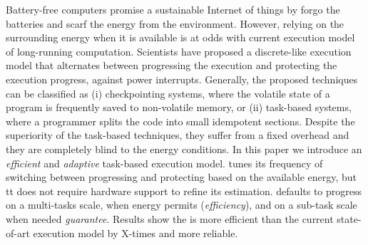 Battery-free computers promise a sustainable Internet of things by forgo the batteries and scarf the energy from the environment. 
However, relying on the surrounding energy when it is available is at odds with current execution model of long-running computation. 
Scientists have proposed a discrete-like execution model that alternates between progressing the execution and protecting the execution progress, against power interrupts.
Generally, the proposed techniques can be classified as (i) checkpointing systems, where the volatile state of a program is frequently saved to non-volatile memory, or (ii) task-based systems, where a programmer splits the code into small idempotent sections. Despite the superiority of the task-based techniques, they suffer from a fixed overhead and they are completely blind to the energy conditions.   
In this paper we introduce \sys an \emph{efficient} and \emph{adaptive} task-based execution model.
\sys tunes its frequency of switching between progressing and protecting based on the available energy, but 
tt does not require hardware support to refine its estimation. 
\sys defaults to progress on a multi-tasks scale, when energy permits (\emph{efficiency}), and on a sub-task scale when needed {\emph{guarantee}}. 
Results show the \sys is more efficient than the current state-of-art execution model by X-times and more reliable. 

